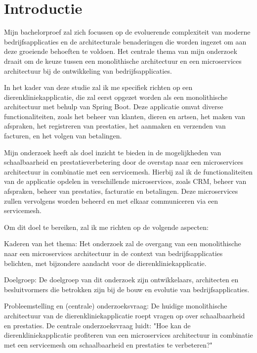 
\section{Introductie}%
\label{sec:introductie}

Mijn bachelorproef zal zich focussen op de evoluerende complexiteit van moderne bedrijfsapplicaties en de architecturale benaderingen die worden ingezet om aan deze groeiende behoeften te voldoen. Het centrale thema van mijn onderzoek draait om de keuze tussen een monolithische architectuur en een microservices architectuur bij de ontwikkeling van bedrijfsapplicaties.

In het kader van deze studie zal ik me specifiek richten op een dierenkliniekapplicatie, die zal eerst opgezet worden als een monolithische architectuur met behulp van Spring Boot. Deze applicatie omvat diverse functionaliteiten, zoals het beheer van klanten, dieren en artsen, het maken van afspraken, het registreren van prestaties, het aanmaken en verzenden van facturen, en het volgen van betalingen.

Mijn onderzoek heeft als doel inzicht te bieden in de mogelijkheden van schaalbaarheid en prestatieverbetering door de overstap naar een microservices architectuur in combinatie met een servicemesh. Hierbij zal ik de functionaliteiten van de applicatie opdelen in verschillende microservices, zoals CRM, beheer van afspraken, beheer van prestaties, facturatie en betalingen. Deze microservices zullen vervolgens worden beheerd en met elkaar communiceren via een servicemesh.

Om dit doel te bereiken, zal ik me richten op de volgende aspecten:

Kaderen van het thema: Het onderzoek zal de overgang van een monolithische naar een microservices architectuur in de context van bedrijfsapplicaties belichten, met bijzondere aandacht voor de dierenkliniekapplicatie.

Doelgroep: De doelgroep van dit onderzoek zijn ontwikkelaars, architecten en besluitvormers die betrokken zijn bij de bouw en evolutie van bedrijfsapplicaties.

Probleemstelling en (centrale) onderzoeksvraag: De huidige monolithische architectuur van de dierenkliniekapplicatie roept vragen op over schaalbaarheid en prestaties. De centrale onderzoeksvraag luidt: "Hoe kan de dierenkliniekapplicatie profiteren van een microservices architectuur in combinatie met een servicemesh om schaalbaarheid en prestaties te verbeteren?"

